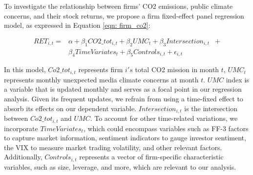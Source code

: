\documentclass[12pt]{article}
\begin{document}
To investigate the relationship between firms' CO2 emissions, public climate concerns, and their stock returns, we propose a firm fixed-effect panel regression model, as expressed in Equation \ref{eqn: firm_co2}:

\begin{equation}
\label{eqn: firm_co2}
\begin{aligned}
RET_{i,t} = & \alpha + \beta_1 CO2\_tot_{i, t} + \beta_2 UMC_{t} + \beta_3 Intersection_{i,t} &+ \\
            & \beta_4 Time Variates_t + \beta_5 Controls_{i, t} + \epsilon_{i, t}
\end{aligned}
\end{equation}

In this model, $Co2\_tot_{i,t}$ represents firm $i's$ total CO2 mission in month $t$,  $UMC_t$ represents monthly unexpected media climate concerns at month $t$. $UMC$ index is a variable that is updated monthly and serves as a focal point in our regression analysis. Given its frequent updates, we refrain from using a time-fixed effect to absorb its effects on our dependent variable. $Intersection_{i,t}$ is the intersection between $Co2\_tot_{i,t}$ and $UMC$. To account for other time-related variations, we incorporate $Time Variates_t$, which could encompass variables such as FF-3 factors to capture market information, sentiment indicators to gauge investor sentiment, the VIX to measure market trading volatility, and other relevant factors. Additionally, $Controls_{i,t}$ represents a vector of firm-specific characteristic variables, such as size, leverage, and more, which are relevant to our analysis.
\end{document}
